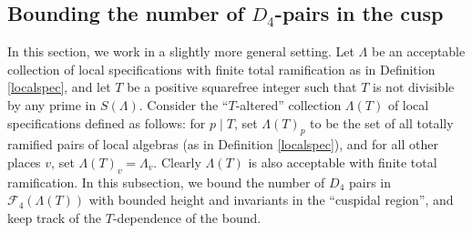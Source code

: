 \documentclass[10pt]{article}
\theoremstyle{plain}
\theoremstyle{definition}
\theoremstyle{remark}
\def\FF{{\mathcal F}}
\begin{document}
\subsection{Bounding the number of $D_4$-pairs in the cusp}

In this section, we work in a slightly more general setting. Let
$\Lambda$ be an acceptable collection of local specifications
with finite total ramification as in Definition \ref{localspec}, and let $T$ be a positive squarefree
integer such that $T$ is not divisible by any prime in
$S(\Lambda)$. Consider the ``$T$-altered'' collection $\Lambda(T)$ of local
specifications defined as follows: for $p\mid T$, set
$\Lambda(T)_p$ to be the set of all totally ramified pairs of local algebras (as in Definition \ref{localspec}),
and for all other places $v$, set $\Lambda(T)_v=\Lambda_v$. Clearly
$\Lambda(T)$ is also acceptable with finite total ramification. In
this subsection, we bound the number of $D_4$ pairs in $\FF_4(\Lambda(T))$ with bounded height and invariants in the ``cuspidal region'', and keep track of the $T$-dependence of the bound. %
\end{document}
